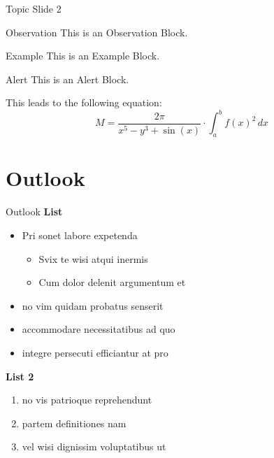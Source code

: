 \documentclass[9pt, xcolor=table]{beamer}
\begin{document}
%
\begin{frame}{Topic Slide 2}
	\begin{block}{Observation}
		This is an Observation Block.
	\end{block}
	\begin{exampleblock}{Example}
		This is an Example Block.
	\end{exampleblock}
	\begin{alertblock}{Alert}
		This is an Alert Block.
	\end{alertblock}
	\vfill
	This leads to the following equation:
	\begin{equation}
		M = \frac{2\pi}{x^5 - y^3 + \sin(x)} \cdot \int_{a}^{b} f(x)^2 \,dx
	\end{equation}
\end{frame}
%
%
\section{Outlook}
\begin{frame}{Outlook}
	\textbf{List}\\
	\begin{itemize}
		\item Pri sonet labore expetenda
		      \begin{itemize}
		      	\item Svix te wisi atqui inermis
		      	\item  Cum dolor delenit argumentum et
		      \end{itemize}
		\item no vim quidam probatus senserit
		\item accommodare necessitatibus ad quo
		\item integre persecuti efficiantur at pro
	\end{itemize}
	\vfill
	\textbf{List 2}\\
	\begin{enumerate}
		\item no vis patrioque reprehendunt
		\item partem definitiones nam
		\item vel wisi dignissim voluptatibus ut
	\end{enumerate}
\end{frame}
%
%
\end{document}
